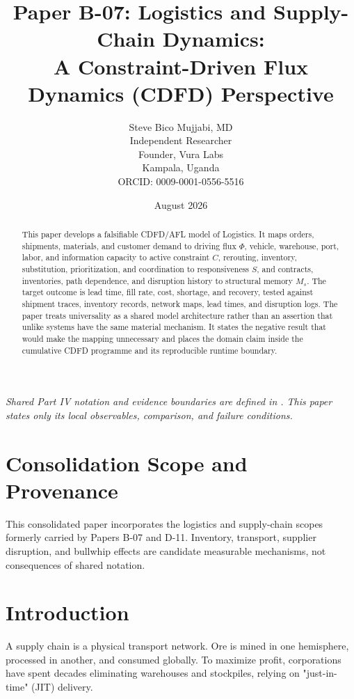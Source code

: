 \documentclass[11pt,a4paper]{article}
\title{\textbf{Paper B-07: Logistics and Supply-Chain Dynamics:\\ A Constraint-Driven Flux Dynamics (CDFD) Perspective}}
\author{Steve Bico Mujjabi, MD\\
\small Independent Researcher\\
\small Founder, Vura Labs\\
\small Kampala, Uganda\\
\small ORCID: 0009-0001-0556-5516}
\date{August 2026}
\begin{document}
\maketitle

\noindent\textit{Shared Part IV notation and evidence boundaries are defined in . This paper states only its local observables, comparison, and failure conditions.}


\begin{abstract}
This paper develops a falsifiable CDFD/AFL model of Logistics. It maps orders, shipments, materials, and customer demand to driving flux $\Phi$, vehicle, warehouse, port, labor, and information capacity to active constraint $C$, rerouting, inventory, substitution, prioritization, and coordination to responsiveness $S$, and contracts, inventories, path dependence, and disruption history to structural memory $M_s$. The target outcome is lead time, fill rate, cost, shortage, and recovery, tested against shipment traces, inventory records, network maps, lead times, and disruption logs. The paper treats universality as a shared model architecture rather than an assertion that unlike systems have the same material mechanism. It states the negative result that would make the mapping unnecessary and places the domain claim inside the cumulative CDFD programme and its reproducible runtime boundary.
\end{abstract}
\section*{Consolidation Scope and Provenance}
This consolidated paper incorporates the logistics and supply-chain scopes formerly carried by Papers B-07 and D-11. Inventory, transport, supplier disruption, and bullwhip effects are candidate measurable mechanisms, not consequences of shared notation.


\section{Introduction}

A supply chain is a physical transport network. Ore is mined in one hemisphere, processed in another, and consumed globally. To maximize profit, corporations have spent decades eliminating warehouses and stockpiles, relying on "just-in-time" (JIT) delivery.
\end{document}
